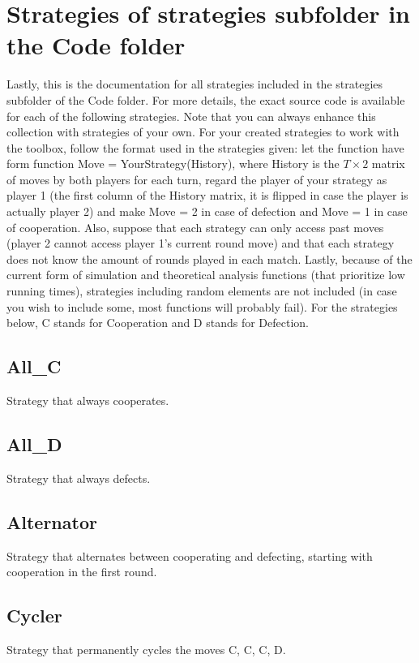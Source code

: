 \documentclass[12pt]{article}
\begin{document}
\section{Strategies of strategies subfolder in the Code folder}
Lastly, this is the documentation for all strategies included in the strategies subfolder of the Code folder. For more details, the exact source code is available for each of the following strategies. Note that you can always enhance this collection with strategies of your own. For your created strategies to work with the toolbox, follow the format used in the strategies given: let the function have form function Move = YourStrategy(History), where History is the $T \times 2$ matrix of moves by both players for each turn, regard the player of your strategy as player 1 (the first column of the History matrix, it is flipped in case the player is actually player 2) and make Move = 2 in case of defection and Move = 1 in case of cooperation. Also, suppose that each strategy can only access past moves (player 2 cannot access player 1's current round move) and that each strategy does not know the amount of rounds played in each match. Lastly, because of the current form of simulation and theoretical analysis functions (that prioritize low running times), strategies including random elements are not included (in case you wish to include some, most functions will probably fail). For the strategies below, C stands for Cooperation and D stands for Defection.

\subsection{All\_C}
Strategy that always cooperates.

\subsection{All\_D}
Strategy that always defects.

\subsection{Alternator}
Strategy that alternates between cooperating and defecting, starting with cooperation in the first round.

\subsection{Cycler}
Strategy that permanently cycles the moves C, C, C, D.
\end{document}

